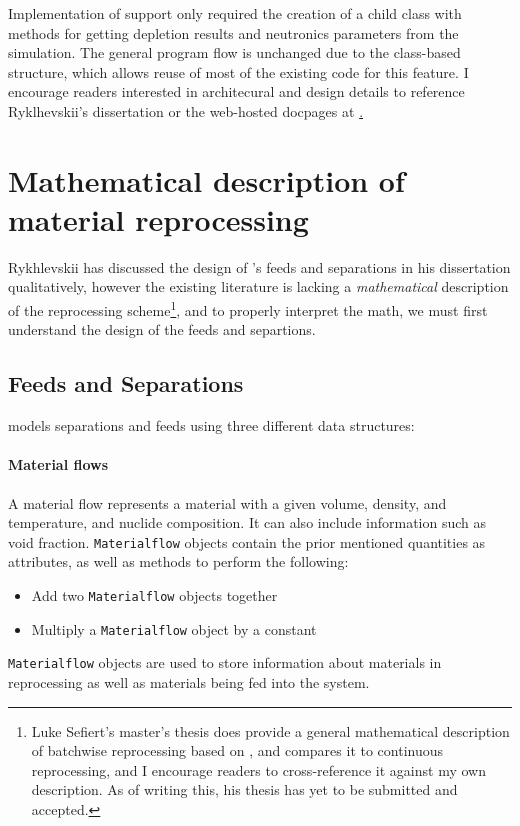 Implementation of \OpenMC support only required the creation of a child class
with methods for getting depletion results and neutronics parameters from the
\OpenMC simulation. The general program flow is unchanged due to the
class-based structure, which allows reuse of most of the existing code for
this feature. I encourage readers interested in architecural and design
details to reference Ryklhevskii's dissertation \cite{rykhlevskii_fuel_2020}
or the web-hosted \SaltProc docpages at \href{arfc.github.io/saltproc}.


\section{Mathematical description of material reprocessing}
Rykhlevskii has discussed the design of \SaltProc's feeds and separations in
his dissertation qualitatively, however the existing \SaltProc literature is lacking a {\it mathematical} description of the reprocessing scheme\footnote{Luke Sefiert's master's thesis does provide a general
mathematical description of batchwise reprocessing based on \SaltProc, and
compares it to continuous reprocessing, and I encourage readers to
cross-reference it against my own description. As of writing this, his thesis
has yet to be submitted and accepted.}, and to properly interpret the math, we
must first understand the design of the feeds and separtions.

\subsection{Feeds and Separations}
\SaltProc models separations and feeds using three different data structures:

\paragraph{Material flows}
    A material flow represents a material with a given
    volume, density, and temperature, and nuclide composition.
    It can also include information such as void fraction. \verb.Materialflow.
    objects contain the prior mentioned quantities as attributes, as well as
    methods to perform the following:
    \begin{itemize}
        \item Add two \verb.Materialflow. objects together
        \item Multiply a \verb.Materialflow. object by a constant
    \end{itemize}
    \verb.Materialflow. objects are used to store information about materials
    in reprocessing as well as materials being fed into the system.

